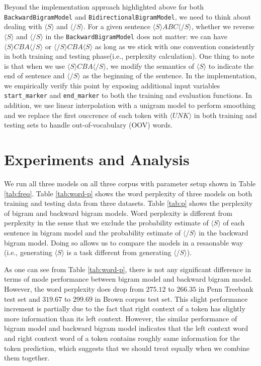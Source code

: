 \documentclass[11pt,a4paper]{article}
\begin{document}
Beyond the implementation approach highlighted above for both \texttt{BackwardBigramModel} and \texttt{BidirectionalBigramModel},
we need to think about dealing with $\langle S \rangle$ and $\langle /S \rangle$. For a given sentence 
$\langle S \rangle A B C \langle /S \rangle$, whether
we reverse $\langle S \rangle$ and $\langle /S \rangle$ in the \texttt{BackwardBigramModel} does not matter: we
can have $\langle S \rangle C B A \langle /S \rangle$ or $\langle /S \rangle C B A \langle S \rangle$ as long as we stick with
one convention consistently in both training and testing phase(i.e., perplexity calculation).
One thing to note is that when we use $\langle S \rangle C B A \langle /S \rangle$, we modify the semantics of $\langle S \rangle$
to indicate the end of sentence and $\langle /S \rangle$ as the beginning of the sentence. In the implementation,
we empirically verify this point by exposing additional input variables \texttt{start\_marker} and \texttt{end\_marker}
to both the training and evaluation functions. In addition, we use linear interpolation with a unigram model to perform smoothing and we replace
the first ouccrence of each token with $\langle UNK \rangle$ in both training and testing sets to handle out-of-vocabulary
(OOV) words.

\section{Experiments and Analysis}

We run all three models on all three corpus with parameter setup shown in Table \ref{tab:freq}.
Table \ref{tab:word-p} shows the word perplexity of three models on both training and testing data from
three datasets. Table \ref{tab:p} shows the perplexity of bigram and backward bigram models. Word perplexity
is different from perplexity in the sense that we exclude the probability estimate of $\langle S \rangle$
of each sentence in bigram model and the probability estimate of $\langle /S \rangle$ in the backward bigram
model. Doing so allows us to compare the models in a resaonable way (i.e., generating $\langle S \rangle$
is a task different from generating $\langle /S \rangle$).

As one can see from Table \ref{tab:word-p}, there is not any significant difference in terms of mode performance
between bigram model and backward bigram model. However, the word perplexity does drop from
$275.12$ to $266.35$ in Penn Treebank test set and $319.67$ to $299.69$ in Brown corpus test set. This slight performance increment
is partially due to the fact that right context of a token has slightly more information than its left context. However,
the similar performance of bigram model and backward bigram model indicates that the left context word and right context
word of a token contains roughly same information for the token prediction, which suggests that we should treat 
equally when we combine them together.
\end{document}
